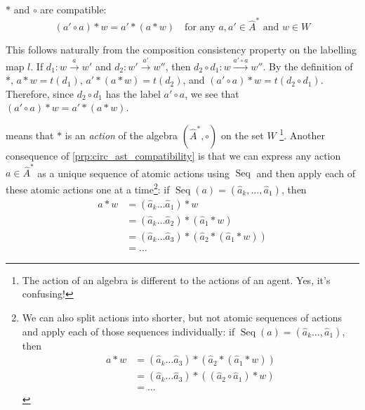 \begin{propositionE}
    \label{prp:circ_ast_compatibility}
    $\ast$ and $\circ$ are compatible:
    \begin{equation}\label{}
        (a' \circ a) \ast w = a' \ast (a \ast w) \quad \text{for any $a, a' \in \hat{A}^{*}$ and $w \in W$}
    \end{equation}
\end{propositionE}
\begin{proofE}
    This follows naturally from the composition consistency property on the labelling map $l$.
    If $d_{1}: w \xrightarrow{a} w'$ and $d_{2}: w' \xrightarrow{a'} w''$, then $d_{2} \circ d_{1}: w \xrightarrow{a' \circ a} w''$.
    By the definition of $\ast$, $a * w = t(d_{1})$, $a' \ast (a \ast w) = t(d_{2})$, and $(a' \circ a) \ast w = t(d_{2} \circ d_{1})$.
    Therefore, since $d_{2} \circ d_{1}$ has the label $a' \circ a$, we see that $(a' \circ a) \ast w = a' \ast (a \ast w)$.
\end{proofE}

 means that $\ast$ is an \emph{action} of the algebra $(\hat{A}^{*}, \circ)$ on the set $W$ \footnote{
    The action of an algebra is different to the actions of an agent.
    Yes, it's confusing!
}.
Another consequence of \cref{prp:circ_ast_compatibility} is that we can express any action $a \in \hat{A}^{*}$ as a unique sequence of atomic actions using $\operatorname{Seq}$ and then apply each of these atomic actions one at a time\footnote{
We can also split actions into shorter, but not atomic sequences of actions and apply each of those sequences individually: if $\operatorname{Seq}(a) = (\hat{a}_{k} \dots, \hat{a}_{1})$, then
\begin{align}
	a \ast w & = (\hat{a}_{k} \dots \hat{a}_{3}) \ast (\hat{a}_{2} \ast (\hat{a}_{1} \ast w))  \\
	         & = (\hat{a}_{k} \dots \hat{a}_{3}) \ast ((\hat{a}_{2} \circ \hat{a}_{1}) \ast w) \\
	         & = \dots
\end{align}
}:
if $\operatorname{Seq}(a) = (\hat{a}_{k}, \dots, \hat{a}_{1})$, then
\begin{align}
    a \ast w & = (\hat{a}_{k} \dots \hat{a}_{1}) \ast w                                       \\
     & = (\hat{a}_{k} \dots \hat{a}_{2}) \ast (\hat{a}_{1} \ast w)                    \\
     & = (\hat{a}_{k} \dots \hat{a}_{3}) \ast (\hat{a}_{2} \ast (\hat{a}_{1} \ast w)) \\
     & = \dots
\end{align}

